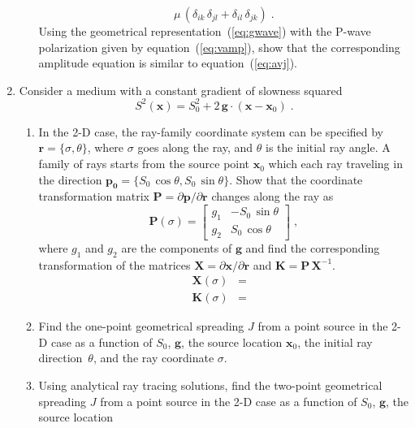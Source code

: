 \begin{enumerate}
\begin{enumerate}
\begin{equation}
  \mu\,(\delta_{ik}\,\delta_{jl} + \delta_{il}\,\delta_{jk})\;.
\end{equation}
Using the geometrical representation~(\ref{eq:gwave}) with the P-wave
polarization given by equation~(\ref{eq:vamp}), show that the
corresponding amplitude equation is similar to
equation~(\ref{eq:avj}).
\end{enumerate}
\item Consider a medium with a constant gradient of slowness squared
  \begin{equation}
    S^2(\mathbf{x}) = S_0^2 + 2\,\mathbf{g} \cdot (\mathbf{x}-\mathbf{x}_0)\;.
  \end{equation}
\begin{enumerate}
\item In the 2-D case, the ray-family coordinate system can be
  specified by $\mathbf{r}=\{\sigma,\theta\}$, where $\sigma$ goes
  along the ray, and $\theta$ is the initial ray angle. A family of
  rays starts from the source point $\mathbf{x}_0$ which each ray
  traveling in the direction $\mathbf{p_0} =
  \{S_0\,\cos{\theta},S_0\,\sin{\theta}\}$. Show that the coordinate
  transformation matrix $\mathbf{P}=\partial \mathbf{p}/\partial
  \mathbf{r}$ changes along the ray as
  \begin{equation}
    \label{eq:p}
    \mathbf{P}(\sigma) = \left[\begin{array}{cc} 
        g_1 & -S_0\,\sin{\theta} \\
        g_2 & S_0\,\cos{\theta} \end{array}\right]\;,
  \end{equation}
  where $g_1$ and $g_2$ are the components of $\mathbf{g}$ and find
  the corresponding transformation of the matrices
  $\mathbf{X}=\partial \mathbf{x}/\partial \mathbf{r}$ and
  $\mathbf{K}=\mathbf{P}\,\mathbf{X}^{-1}$.
  \begin{eqnarray}
    \label{eq:x}
    \mathbf{X}(\sigma)  & = & \\ 
    \mathbf{K}(\sigma)  & = & 
    \label{eq:k}
    \end{eqnarray}
  \item Find the one-point geometrical spreading $J$ from a point
    source in the 2-D case as a function of $S_0$, $\mathbf{g}$, the
    source location $\mathbf{x}_0$, the initial ray
    direction~$\theta$, and the ray coordinate $\sigma$.
  \item Using analytical ray tracing solutions, find the two-point
    geometrical spreading $J$ from a point source in the 2-D case as a
    function of $S_0$, $\mathbf{g}$, the source location

\end{enumerate}
\end{enumerate}
